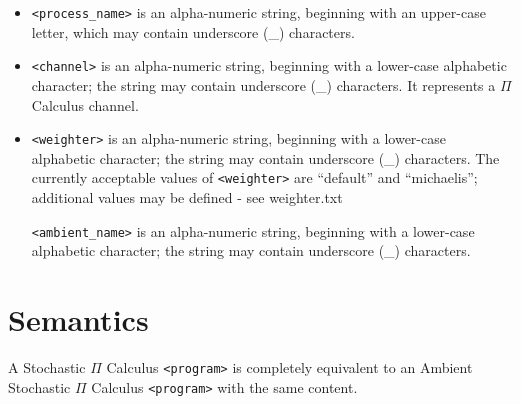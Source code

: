 \begin{itemize}
\item
\verb+<process_name>+ is an alpha-numeric string, beginning with an
upper-case letter, which may contain underscore (\_) characters.

\item
\verb+<channel>+ is an alpha-numeric string, beginning with a lower-case
alphabetic character; the string may contain underscore (\_) characters.
It represents a $\Pi$ Calculus channel.

\item
\verb+<weighter>+ is an alpha-numeric string, beginning with a lower-case
alphabetic character; the string may contain underscore (\_)
characters.  The currently acceptable values of \verb+<weighter>+ are
``default'' and ``michaelis''; additional values may be defined - see
weighter.txt

\verb+<ambient_name>+ is an alpha-numeric string, beginning with
a lower-case alphabetic character; the string may contain
underscore (\_) characters.
\end{itemize}

\section{Semantics}

A Stochastic $\Pi$ Calculus \verb+<program>+ is completely
equivalent to an Ambient Stochastic $\Pi$ Calculus
\verb+<program>+ with the same content.
 
